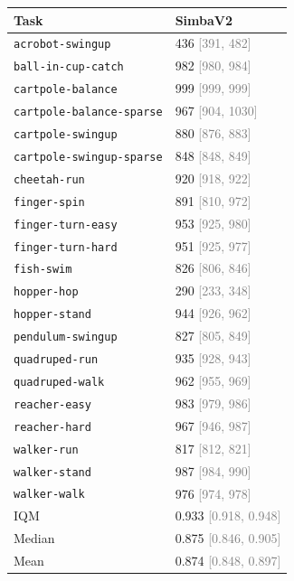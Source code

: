 \begin{tabular}{ll}
\toprule
\textbf{Task} & \textbf{SimbaV2} \\
\midrule
\texttt{acrobot-swingup} & 436 \textcolor{gray}{[391, 482]} \\
\texttt{ball-in-cup-catch} & 982 \textcolor{gray}{[980, 984]} \\
\texttt{cartpole-balance} & 999 \textcolor{gray}{[999, 999]} \\
\texttt{cartpole-balance-sparse} & 967 \textcolor{gray}{[904, 1030]} \\
\texttt{cartpole-swingup} & 880 \textcolor{gray}{[876, 883]} \\
\texttt{cartpole-swingup-sparse} & 848 \textcolor{gray}{[848, 849]} \\
\texttt{cheetah-run} & 920 \textcolor{gray}{[918, 922]} \\
\texttt{finger-spin} & 891 \textcolor{gray}{[810, 972]} \\
\texttt{finger-turn-easy} & 953 \textcolor{gray}{[925, 980]} \\
\texttt{finger-turn-hard} & 951 \textcolor{gray}{[925, 977]} \\
\texttt{fish-swim} & 826 \textcolor{gray}{[806, 846]} \\
\texttt{hopper-hop} & 290 \textcolor{gray}{[233, 348]} \\
\texttt{hopper-stand} & 944 \textcolor{gray}{[926, 962]} \\
\texttt{pendulum-swingup} & 827 \textcolor{gray}{[805, 849]} \\
\texttt{quadruped-run} & 935 \textcolor{gray}{[928, 943]} \\
\texttt{quadruped-walk} & 962 \textcolor{gray}{[955, 969]} \\
\texttt{reacher-easy} & 983 \textcolor{gray}{[979, 986]} \\
\texttt{reacher-hard} & 967 \textcolor{gray}{[946, 987]} \\
\texttt{walker-run} & 817 \textcolor{gray}{[812, 821]} \\
\texttt{walker-stand} & 987 \textcolor{gray}{[984, 990]} \\
\texttt{walker-walk} & 976 \textcolor{gray}{[974, 978]} \\
IQM & 0.933 \textcolor{gray}{[0.918, 0.948]} \\
Median & 0.875 \textcolor{gray}{[0.846, 0.905]} \\
Mean & 0.874 \textcolor{gray}{[0.848, 0.897]} \\
\bottomrule
\end{tabular}

